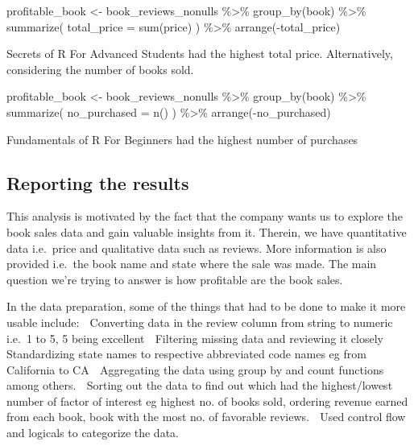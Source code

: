 \documentclass[
]{article}
\newenvironment{Shaded}{\begin{snugshade}}{\end{snugshade}}
\newcommand{\AttributeTok}[1]{\textcolor[rgb]{0.77,0.63,0.00}{#1}}
\newcommand{\FunctionTok}[1]{\textcolor[rgb]{0.00,0.00,0.00}{#1}}
\newcommand{\NormalTok}[1]{#1}
\newcommand{\OtherTok}[1]{\textcolor[rgb]{0.56,0.35,0.01}{#1}}
\newcommand{\SpecialCharTok}[1]{\textcolor[rgb]{0.00,0.00,0.00}{#1}}
\begin{document}
\begin{Shaded}
\begin{Highlighting}[]
\NormalTok{profitable\_book }\OtherTok{\textless{}{-}}\NormalTok{ book\_reviews\_nonulls }\SpecialCharTok{\%\textgreater{}\%}
  \FunctionTok{group\_by}\NormalTok{(book) }\SpecialCharTok{\%\textgreater{}\%}
  \FunctionTok{summarize}\NormalTok{(}
    \AttributeTok{total\_price =} \FunctionTok{sum}\NormalTok{(price)}
\NormalTok{  ) }\SpecialCharTok{\%\textgreater{}\%}
  \FunctionTok{arrange}\NormalTok{(}\SpecialCharTok{{-}}\NormalTok{total\_price)}
\end{Highlighting}
\end{Shaded}

Secrets of R For Advanced Students had the highest total price.
Alternatively, considering the number of books sold.

\begin{Shaded}
\begin{Highlighting}[]
\NormalTok{profitable\_book }\OtherTok{\textless{}{-}}\NormalTok{ book\_reviews\_nonulls }\SpecialCharTok{\%\textgreater{}\%}
  \FunctionTok{group\_by}\NormalTok{(book) }\SpecialCharTok{\%\textgreater{}\%}
  \FunctionTok{summarize}\NormalTok{(}
    \AttributeTok{no\_purchased =} \FunctionTok{n}\NormalTok{()}
\NormalTok{  ) }\SpecialCharTok{\%\textgreater{}\%}
  \FunctionTok{arrange}\NormalTok{(}\SpecialCharTok{{-}}\NormalTok{no\_purchased)}
\end{Highlighting}
\end{Shaded}

Fundamentals of R For Beginners had the highest number of purchases

\hypertarget{reporting-the-results}{%
\subsection{Reporting the results}\label{reporting-the-results}}

This analysis is motivated by the fact that the company wants us to
explore the book sales data and gain valuable insights from it. Therein,
we have quantitative data i.e.~price and qualitative data such as
reviews. More information is also provided i.e.~the book name and state
where the sale was made. The main question we're trying to answer is how
profitable are the book sales.

In the data preparation, some of the things that had to be done to make
it more usable include:  Converting data in the review column from
string to numeric i.e.~1 to 5, 5 being excellent  Filtering missing
data and reviewing it closely  Standardizing state names to respective
abbreviated code names eg from California to CA  Aggregating the data
using group by and count functions among others.  Sorting out the data
to find out which had the highest/lowest number of factor of interest eg
highest no. of books sold, ordering revenue earned from each book, book
with the most no. of favorable reviews.  Used control flow and logicals
to categorize the data.
\end{document}
